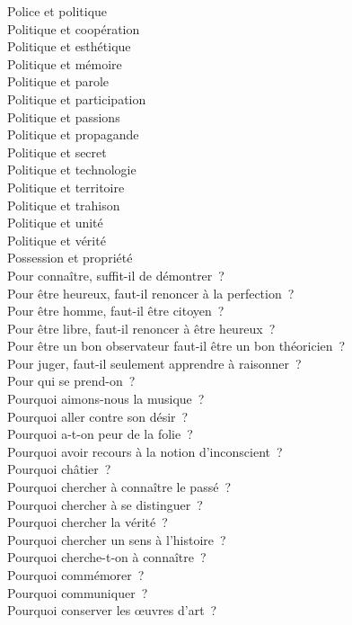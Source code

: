 \documentclass[a4paper,12pt]{article}
\begin{document}
Police et politique \\
Politique et coopération \\
Politique et esthétique \\
Politique et mémoire \\
Politique et parole \\
Politique et participation \\
Politique et passions \\
Politique et propagande \\
Politique et secret \\
Politique et technologie \\
Politique et territoire \\
Politique et trahison \\
Politique et unité \\
Politique et vérité \\
Possession et propriété \\
Pour connaître, suffit-il de démontrer ? \\
Pour être heureux, faut-il renoncer à la perfection ? \\
Pour être homme, faut-il être citoyen ? \\
Pour être libre, faut-il renoncer à être heureux ? \\
Pour être un bon observateur faut-il être un bon théoricien ? \\
Pour juger, faut-il seulement apprendre à raisonner ? \\
Pour qui se prend-on ? \\
Pourquoi aimons-nous la musique ? \\
Pourquoi aller contre son désir ? \\
Pourquoi a-t-on peur de la folie ? \\
Pourquoi avoir recours à la notion d'inconscient ? \\
Pourquoi châtier ? \\
Pourquoi chercher à connaître le passé ? \\
Pourquoi chercher à se distinguer ? \\
Pourquoi chercher la vérité ? \\
Pourquoi chercher un sens à l'histoire ? \\
Pourquoi cherche-t-on à connaître ? \\
Pourquoi commémorer ? \\
Pourquoi communiquer ? \\
Pourquoi conserver les œuvres d'art ? \\
\end{document}
